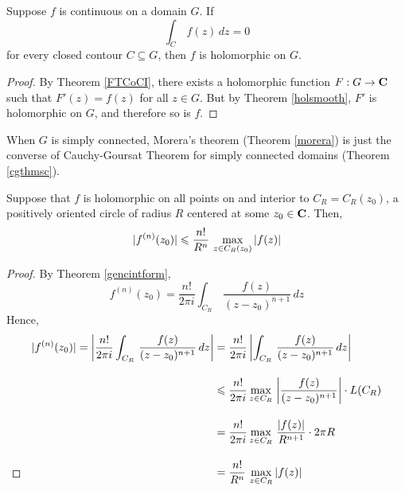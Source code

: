\medskip

\begin{theorem}\label{morera}
Suppose $f$ is continuous on a domain $G$. If
\[\int_C\,f(z)\,dz = 0\]
for every closed contour $C \subseteq G$, then $f$ is holomorphic on $G$. 
\end{theorem}
\begin{proof}
By Theorem \ref{FTCoCI}, there exists a holomorphic function $F:G \to \mathbf C$ such that $F'(z) = f(z)$ for all $z \in G$. But by Theorem \ref{holsmooth}, $F'$ is holomorphic on $G$, and therefore so is $f$. 
\end{proof}

\medskip

\begin{remark}
When $G$ is simply connected, Morera's theorem (Theorem \ref{morera}) is just the converse of Cauchy-Goursat Theorem for simply connected domains (Theorem \ref{cgthmsc}).
\end{remark}

\medskip

\begin{theorem}\label{cauchyineq}
Suppose that $f$ is holomorphic on all points on and interior to $C_R = C_R(z_0)$, a positively oriented circle of radius $R$ centered at some $z_0 \in \mathbf C$. Then,
\[|f^{(n)}(z_0)| \leqslant \frac{n!}{R^n}\,\max_{z \in C_R(z_0)}\left\lvert f(z)\right\rvert\]
\end{theorem}
\begin{proof}
By Theorem \ref{gencintform}, 
\[f^{(n)}(z_0) = \frac{n!}{2\pi i}\int_{C_R}\,\frac{f(z)}{(z - z_0)^{n+1}}\,dz\]
Hence, 
\begin{align*}
|f^{(n)}(z_0)|= \left\lvert\frac{n!}{2\pi i}\int_{C_R}\,\frac{f(z)}{(z - z_0)^{n+1}}\,dz\right\rvert &= \frac{n!}{2\pi i}\left\lvert\int_{C_R}\,\frac{f(z)}{(z - z_0)^{n+1}}\,dz\right\rvert\\[1em]
&\leqslant \frac{n!}{2\pi i}\max_{z \in C_R}\,\left\lvert\frac{f(z)}{(z - z_0)^{n+1}}\right\rvert\cdot L(C_R)\\[1em]
&= \frac{n!}{2\pi i}\max_{z \in C_R}\,\frac{\left\lvert f(z)\right\rvert}{R^{n+1}}\cdot 2\pi R\\[1em]
&= \frac{n!}{R^n}\,\max_{z \in C_R}\left\lvert f(z)\right\rvert\\[-2.5em]
\end{align*}
\end{proof}

\bigskip

